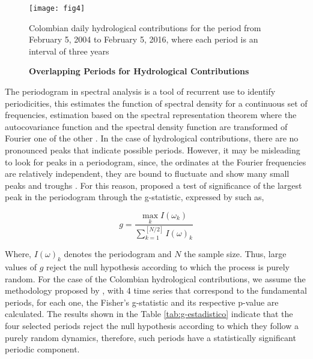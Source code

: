\documentclass[12pt,halfline,a4paper]{ouparticle}
\begin{document}
\begin{figure}[h]
	\centering
	\texttt{[image: fig4]}
	\caption{\textbf{Overlapping Periods for Hydrological Contributions}}
	\medskip
	\begin{minipage}{0.8\textwidth} 
		{\footnotesize{Colombian daily hydrological contributions for the period from February 5, 2004 to February 5, 2016, where each period is an interval of three years\par}}
	\end{minipage}
	\label{fig:4}
\end{figure}

The periodogram in spectral analysis is a tool of recurrent use to identify periodicities, this estimates the function of spectral density for a continuous set of frequencies, estimation based on the spectral representation theorem where the autocovariance function and the spectral density function are transformed of Fourier one of the other \citep{Madisetti1998}. In the case of hydrological contributions, there are no pronounced peaks that indicate possible periods. However, it may be misleading to look for peaks in a periodogram, since, the ordinates at the Fourier frequencies are relatively independent, they are bound to fluctuate and show many small peaks and troughs \citep{Bloomfield2004}. For this reason, \cite{Fisher1929} proposed a test of significance of the largest peak in the periodogram through the g-statistic, expressed by \cite{Wichert2004} such as,

\begin{equation}
g=\frac{\max_{k}I(\omega_{k})}{\sum_{k=1}^{[N/2]}I(\omega)_{k}}
\end{equation}

Where, $I(\omega)_{k}$ denotes the periodogram and $N$ the sample size. Thus, large values of $g$ reject the null hypothesis according to which the process is purely random. For the case of the Colombian hydrological contributions, we assume the methodology proposed by \cite{Wichert2004}, with 4 time series that correspond to the fundamental periods, for each one, the Fisher's g-statistic and its respective p-value are calculated. The results shown in the Table \ref{tab:g-estadistico} indicate that the four selected periods reject the null hypothesis according to which they follow a purely random dynamics, therefore, such periods have a statistically significant periodic component.
\end{document}
